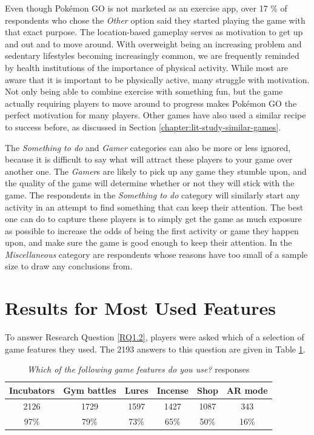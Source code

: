 Even though Pokémon GO is not marketed as an exercise app, over 17 \% of respondents who chose the \emph{Other} option said they started playing the game with that exact purpose. The location-based gameplay serves as motivation to get up and out and to move around. With overweight being an increasing problem and sedentary lifestyles becoming increasingly common, we are frequently reminded by health institutions of the importance of physical activity. While most are aware that it is important to be physically active, many struggle with motivation. Not only being able to combine exercise with something fun, but the game actually requiring players to move around to progress makes Pokémon GO the perfect motivation for many players. Other games have also used a similar recipe to success before, as discussed in Section \ref{chapter:lit-study-similar-games}.

The \emph{Something to do} and \emph{Gamer} categories can also be more or less ignored, because it is difficult to say what will attract these players to your game over another one. The \emph{Gamer}s are likely to pick up any game they stumble upon, and the quality of the game will determine whether or not they will stick with the game. The respondents in the \emph{Something to do} category will similarly start any activity in an attempt to find something that can keep their attention. The best one can do to capture these players is to simply get the game as much exposure as possible to increase the odds of being the first activity or game they happen upon, and make sure the game is good enough to keep their attention. In the \emph{Miscellaneous} category are respondents whose reasons have too small of a sample size to draw any conclusions from.


\section{Results for Most Used Features}
\label{sec:success-factors-features}

To answer Research Question \ref{RQ1.2}, players were asked which of a selection of game features they used. The 2193 answers to this question are given in Table \ref{tbl:pokemon-go-features-used}.

\begin{table}[h]
	\centering
	\caption{\emph{Which of the following game features do you use?} responses}
	\label{tbl:pokemon-go-features-used}
	\begin{tabular}{|c|c|c|c|c|c|}
		\hline
		\textbf{Incubators} & \textbf{Gym battles} & \textbf{Lures} & \textbf{Incense} & \textbf{Shop} & \textbf{AR mode}\\
		\hline\hline
		2126	& 1729	& 1597	& 1427	& 1087	& 343\\
		97\%	& 79\%	& 73\%	& 65\%	& 50\%	& 16\%\\\hline
	\end{tabular}
\end{table}


